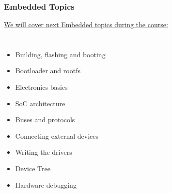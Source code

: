 \begin{frame}
  \frametitle{Embedded Topics}
  \underline{We will cover next Embedded topics during the course:}
  \begin{columns}
      \begin{itemize}
        \item<1-> Building, flashing and booting
        \item<2-> Bootloader and rootfs
        \item<3-> Electronics basics
        \item<4-> SoC architecture
        \item<5-> Buses and protocols
        \item<6-> Connecting external devices
        \item<7-> Writing the drivers
        \item<8-> Device Tree
        \item<9-> Hardware debugging
      \end{itemize}

\end{columns}
\end{frame}
